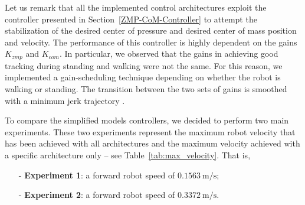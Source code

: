 Let us remark that all the implemented control architectures exploit the controller presented in Section~\ref{ZMP-CoM-Controller} to attempt the stabilization of the desired center of pressure and desired center of mass position and velocity. The performance of this controller is highly dependent on the gains $K_{zmp}$ and $K_{com}$. In particular, we observed that the gains in achieving good tracking during standing and walking were not the same. For this reason, we implemented a gain-scheduling technique depending on whether the robot is walking or standing. The transition between the two sets of gains is smoothed with a minimum jerk trajectory \citep{Pattacini2010}.


To compare the simplified models controllers, we decided to perform two main experiments. These two experiments represent the maximum robot velocity that has been achieved with all architectures and the maximum velocity achieved with a specific architecture only -- see Table~\ref{tab:max_velocity}. That is, 
\begin{itemize}
    \item[-] \textbf{Experiment 1}: a forward robot speed of $\SI{0.1563}{\meter \per \second}$;
    \item[-] \textbf{Experiment 2}: a forward robot speed of $\SI{0.3372}{\meter \per \second}$.
\end{itemize}

